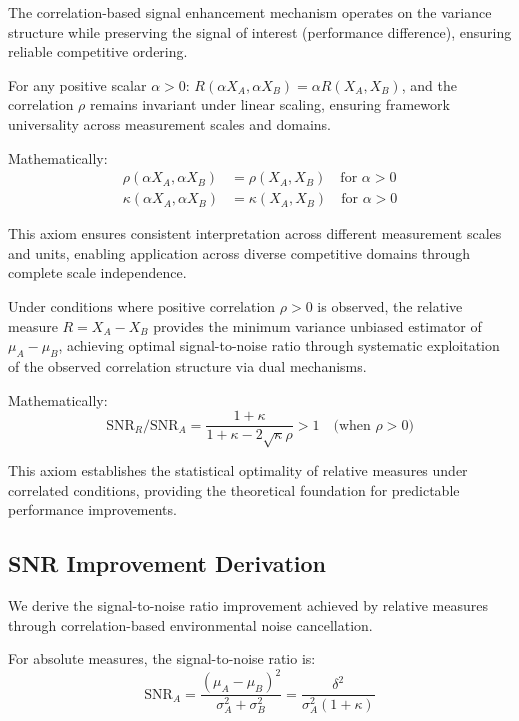 The correlation-based signal enhancement mechanism operates on the variance structure while preserving the signal of interest (performance difference), ensuring reliable competitive ordering.

\begin{axiom}
For any positive scalar $\alpha > 0$: $R(\alpha X_A, \alpha X_B) = \alpha R(X_A, X_B)$, and the correlation $\rho$ remains invariant under linear scaling, ensuring framework universality across measurement scales and domains.

Mathematically:
\begin{align}
\rho(\alpha X_A, \alpha X_B) &= \rho(X_A, X_B) \quad \text{for } \alpha > 0 \\
\kappa(\alpha X_A, \alpha X_B) &= \kappa(X_A, X_B) \quad \text{for } \alpha > 0
\end{align}
\end{axiom}

This axiom ensures consistent interpretation across different measurement scales and units, enabling application across diverse competitive domains through complete scale independence.

\begin{axiom}
Under conditions where positive correlation $\rho > 0$ is observed, the relative measure $R = X_A - X_B$ provides the minimum variance unbiased estimator of $\mu_A - \mu_B$, achieving optimal signal-to-noise ratio through systematic exploitation of the observed correlation structure via dual mechanisms.

Mathematically:
$$\text{SNR}_R/\text{SNR}_A = \frac{1 + \kappa}{1 + \kappa - 2\sqrt{\kappa}\rho} > 1 \quad \text{(when } \rho > 0\text{)}$$
\end{axiom}

This axiom establishes the statistical optimality of relative measures under correlated conditions, providing the theoretical foundation for predictable performance improvements.

\subsection{SNR Improvement Derivation}

We derive the signal-to-noise ratio improvement achieved by relative measures through correlation-based environmental noise cancellation.

For absolute measures, the signal-to-noise ratio is:
\begin{equation}
\text{SNR}_A = \frac{(\mu_A - \mu_B)^2}{\sigma_A^2 + \sigma_B^2} = \frac{\delta^2}{\sigma_A^2(1 + \kappa)} \label{eq:absolute_snr}
\end{equation}

